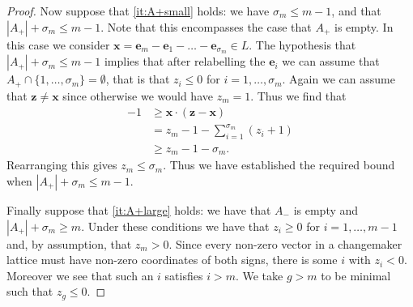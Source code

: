 \documentclass{amsart} %
\newcommand{\e}{\bm{e}}
\theoremstyle{thm}
\theoremstyle{definition}
\numberwithin{equation}{section}
\begin{document}
\begin{proof}
Now suppose that \eqref{it:A+small} holds: we have $\sigma_m\leq m-1$, and that $|A_+|+\sigma_m\leq m-1$. Note that this encompasses the case that $A_+$ is empty. In this case we consider $\bm{x}=\e_m-\e_1-\dots - \e_{\sigma_m}\in L$. The hypothesis that $|A_+|+\sigma_m\leq m-1$ implies that after relabelling the $\e_i$ we can assume that $A_+ \cap \{1, \dots, \sigma_m\}=\emptyset$, that is that $z_i\leq 0$ for $i=1, \dots, \sigma_m$. Again we can assume that $\bm{z}\neq \bm{x}$ since otherwise we would have $z_m=1$. Thus we find that
\begin{align*}
    -1&\geq \bm{x}\cdot (\bm{z}-\bm{x}) \\
    &= z_m-1 - \sum_{i=1}^{\sigma_m} (z_i+1)\\
    &\geq z_m -1 -\sigma_m.
\end{align*}
Rearranging this gives $z_m\leq \sigma_m$. Thus we have established the required bound when $|A_+|+\sigma_m\leq m-1$.

Finally suppose that \eqref{it:A+large} holds: we have that $A_-$ is empty and $|A_+|+\sigma_m\geq m$. Under these conditions we have that $z_i\geq 0$ for $i=1,\dots, m-1$ and, by assumption, that $z_m>0$. Since every non-zero vector in a changemaker lattice must have non-zero coordinates of both signs, there is some $i$ with $z_i<0$. Moreover we see that such an $i$ satisfies $i>m$. We take $g>m$ to be minimal such that $z_g\leq 0$.


\end{proof}
\end{document}
